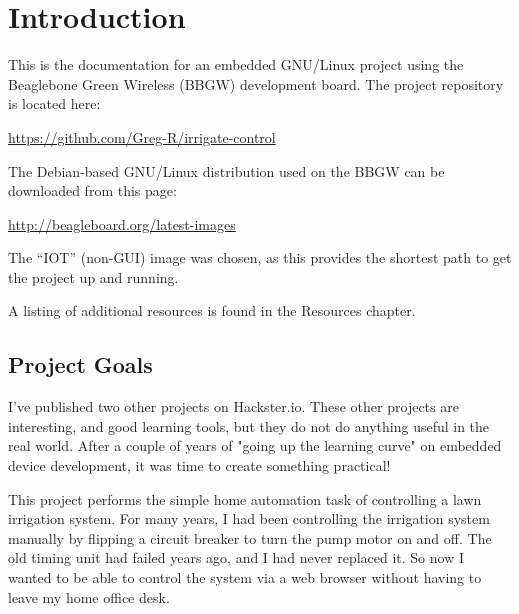 %
%
%

\chapter{Introduction}

This is the documentation for an embedded GNU/Linux project using the 
Beaglebone Green Wireless (BBGW) development board.  The project repository is 
located here:

\url{https://github.com/Greg-R/irrigate-control}

The Debian-based GNU/Linux distribution used on the BBGW can be downloaded from 
this page:

\url{http://beagleboard.org/latest-images}

The ``IOT'' (non-GUI) image was chosen, as this provides the shortest path to get the project up and running.

A listing of additional resources is found in the Resources chapter.

\section{Project Goals}

I've published two other projects on Hackster.io.  These other projects are 
interesting, and good learning tools, but they do not do anything useful in the 
real world.  After a couple of years of "going up the learning curve" on 
embedded device development, it was time to create something practical!

This project performs the simple home automation task of controlling a lawn 
irrigation system.  For many years, I had been controlling the irrigation 
system manually by flipping a circuit breaker to turn the pump motor on and 
off.  The old timing unit had failed years ago, and I had never replaced it.  
So now I wanted to be able to control the system via a web browser without 
having to leave my home office desk.

